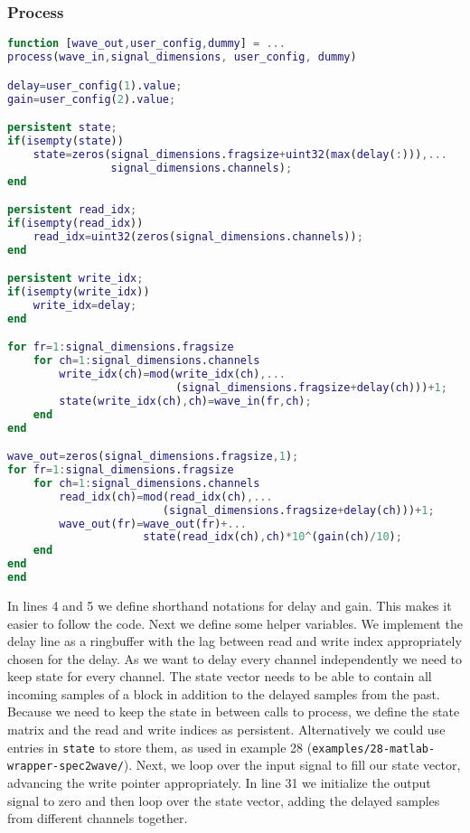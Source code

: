 \documentclass[11pt,a4paper,twoside]{article}
\newcommand{\+}{\discretionary{\mbox{\scriptsize$\hookleftarrow$}}{}{}}
\begin{document}
\subsubsection*{Process}
\begin{lstlisting}[language=Matlab]
function [wave_out,user_config,dummy] = ...
process(wave_in,signal_dimensions, user_config, dummy)

delay=user_config(1).value;
gain=user_config(2).value;

persistent state;
if(isempty(state))
    state=zeros(signal_dimensions.fragsize+uint32(max(delay(:))),...
                signal_dimensions.channels);
end

persistent read_idx;
if(isempty(read_idx))
    read_idx=uint32(zeros(signal_dimensions.channels));
end

persistent write_idx;
if(isempty(write_idx))
    write_idx=delay;
end

for fr=1:signal_dimensions.fragsize
    for ch=1:signal_dimensions.channels
        write_idx(ch)=mod(write_idx(ch),...
                          (signal_dimensions.fragsize+delay(ch)))+1;
        state(write_idx(ch),ch)=wave_in(fr,ch);
    end
end

wave_out=zeros(signal_dimensions.fragsize,1);
for fr=1:signal_dimensions.fragsize
    for ch=1:signal_dimensions.channels
        read_idx(ch)=mod(read_idx(ch),... 
                        (signal_dimensions.fragsize+delay(ch)))+1;
        wave_out(fr)=wave_out(fr)+...
                     state(read_idx(ch),ch)*10^(gain(ch)/10);
    end
end
end
\end{lstlisting}
In lines 4 and 5 we define shorthand notations for delay and gain. This makes it
easier to follow the code.
Next we define some helper variables. We implement
the delay line as a ringbuffer with the lag between read and write index
appropriately chosen for the delay. As we want to delay every channel
independently we need to keep state for every channel. The state vector
needs to be able to contain all incoming samples of a block in addition to the
delayed samples from the past. Because we need to keep the state in between
calls to process, we define the state matrix and the read and write indices as
persistent. Alternatively we could use entries in \texttt{state} to
store them, as used in example 28 (\texttt{examples/28-matlab-wrapper-spec2wave/}).
Next, we loop over the input signal to fill our state vector,
advancing the write pointer appropriately. In line 31 we initialize the output
signal to zero and then loop over the state vector, adding the delayed samples
from different channels together.
\end{document}
